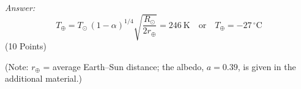 \textit{Answer:}
\[
T_\oplus = T_\odot\,(1-\alpha)^{1/4}\sqrt{\frac{R_\odot}{2r_\oplus}}
         = 246~\mathrm{K}
\quad\text{or}\quad
T_\oplus = -27\,^\circ\mathrm{C}
\]
\hfill(10 Points)

(Note: $r_\oplus$ = average Earth--Sun distance; the albedo, $a = 0.39$, is
given in the additional material.)
